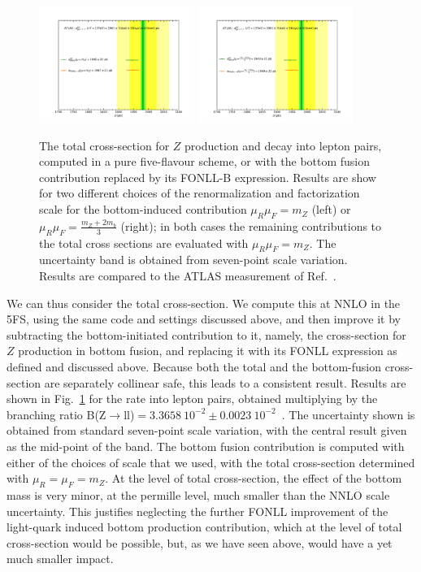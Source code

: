 \documentclass[12pt]{article}
\begin{document}
\begin{figure}
  \begin{center}
    \includegraphics[width=0.45\textwidth]{tot_xs_mz.pdf}
    \includegraphics[width=0.45\textwidth]{tot_xsmzmb.pdf} 
    \caption{\label{fig:ztotal}
The total cross-section for $Z$ production and decay into lepton
pairs, 
computed in a pure
five-flavour scheme, or with the bottom fusion contribution replaced
by its FONLL-B expression. Results are show for two different choices
of the renormalization and factorization scale  for the bottom-induced
contribution $\mu_R\mu_F=m_Z$ (left) or
$\mu_R\mu_F=\frac{m_Z+2m_b}{3}$ (right); in both cases the remaining
contributions to the total cross sections are evaluated with
$\mu_R\mu_F=m_Z$. The uncertainty band is obtained from seven-point
scale variation.
 Results are compared to the ATLAS measurement of
Ref.~\cite{Aad:2016naf}. }
  \end{center}
\end{figure}
%
We can thus consider the total cross-section. We compute this 
at NNLO in
the 5FS, using the same code and settings discussed above, and then
improve it by  subtracting
the bottom-initiated contribution to it, namely, the cross-section for
$Z$ production in bottom fusion, and  
replacing it with its FONLL expression as defined and discussed
above. Because both the total and the bottom-fusion cross-section are
separately collinear safe, this leads to a consistent result.
Results are shown in Fig.~\ref{fig:ztotal} for the rate into
lepton pairs, obtained multiplying by the branching ratio B(Z$\to$ll)$=3.3658~10^{-2}\pm 0.0023~10^{-2}$~\cite{Tanabashi:2018oca}. The uncertainty shown is
obtained from standard seven-point scale variation, with the central
result given as the mid-point of the band.  The bottom fusion
contribution is computed with either of the choices of scale that we
used, with the total cross-section determined with $\mu_R=\mu_F=m_Z$. 
At the level of total cross-section, the effect of the
bottom mass is very minor, at the permille level, much smaller
than the NNLO scale uncertainty. This justifies neglecting the further
FONLL improvement of the light-quark induced bottom production
contribution, which at the level of total cross-section would be
possible, but, as we have seen above, would have a yet much smaller
impact. 
\end{document}
